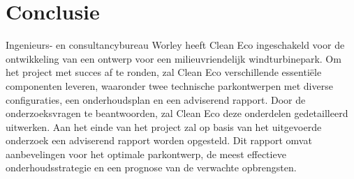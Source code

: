 \section{Conclusie}
Ingenieurs- en consultancybureau Worley heeft Clean Eco ingeschakeld voor de ontwikkeling van een ontwerp voor een milieuvriendelijk windturbinepark. Om het project met succes af te ronden, zal Clean Eco verschillende essentiële componenten leveren, waaronder twee technische parkontwerpen met diverse configuraties, een onderhoudsplan en een adviserend rapport. Door de onderzoeksvragen te beantwoorden, zal Clean Eco deze onderdelen gedetailleerd uitwerken. Aan het einde van het project zal op basis van het uitgevoerde onderzoek een adviserend rapport worden opgesteld. Dit rapport omvat aanbevelingen voor het optimale parkontwerp, de meest effectieve onderhoudsstrategie en een prognose van de verwachte opbrengsten.